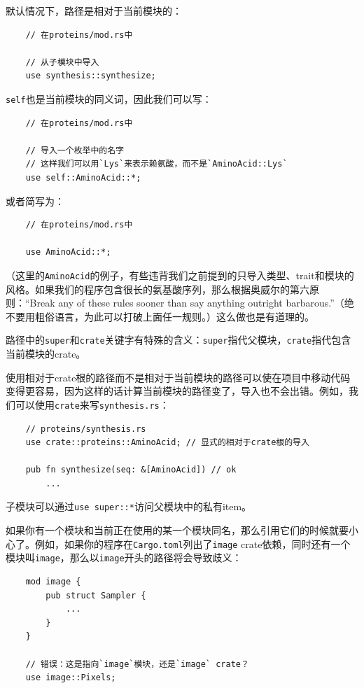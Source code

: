 默认情况下，路径是相对于当前模块的：
\begin{verbatim}
    // 在proteins/mod.rs中

    // 从子模块中导入
    use synthesis::synthesize;
\end{verbatim}

\texttt{self}也是当前模块的同义词，因此我们可以写：
\begin{verbatim}
    // 在proteins/mod.rs中

    // 导入一个枚举中的名字
    // 这样我们可以用`Lys`来表示赖氨酸，而不是`AminoAcid::Lys`
    use self::AminoAcid::*;
\end{verbatim}

或者简写为：
\begin{verbatim}
    // 在proteins/mod.rs中

    use AminoAcid::*;
\end{verbatim}

（这里的\texttt{AminoAcid}的例子，有些违背我们之前提到的只导入类型、trait和模块的风格。如果我们的程序包含很长的氨基酸序列，那么根据奥威尔的第六原则：“Break any of these rules sooner than say anything outright barbarous.”（绝不要用粗俗语言，为此可以打破上面任一规则。）这么做也是有道理的。

路径中的\texttt{super}和\texttt{crate}关键字有特殊的含义：\texttt{super}指代父模块，\texttt{crate}指代包含当前模块的crate。

使用相对于crate根的路径而不是相对于当前模块的路径可以使在项目中移动代码变得更容易，因为这样的话计算当前模块的路径变了，导入也不会出错。例如，我们可以使用\texttt{crate}来写\texttt{synthesis.rs}：
\begin{verbatim}
    // proteins/synthesis.rs
    use crate::proteins::AminoAcid; // 显式的相对于crate根的导入

    pub fn synthesize(seq: &[AminoAcid]) // ok
        ...
\end{verbatim}

子模块可以通过\texttt{use super::*}访问父模块中的私有item。

如果你有一个模块和当前正在使用的某一个模块同名，那么引用它们的时候就要小心了。例如，如果你的程序在\texttt{Cargo.toml}列出了\texttt{image} crate依赖，同时还有一个模块叫\texttt{image}，那么以\texttt{image}开头的路径将会导致歧义：
\begin{verbatim}
    mod image {
        pub struct Sampler {
            ...
        }
    }

    // 错误：这是指向`image`模块，还是`image` crate？
    use image::Pixels;
\end{verbatim}

